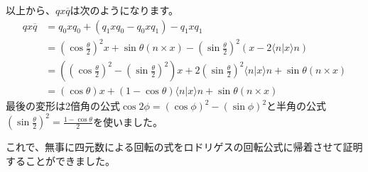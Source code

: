 \documentclass{jlreq}
\numberwithin{equation}{section}
\begin{document}
以上から、$qx\overline{q}$は次のようになります。
\begin{align}
    qx\overline{q} & =q_0xq_0+(q_1xq_0-q_0xq_1)-q_1xq_1                                                                                                                                    \\
                   & =\left(\cos\frac{\theta}{2}\right)^2x+\sin\theta(n\times x)-\left(\sin\frac{\theta}{2}\right)^2(x-2\langle n|x\rangle n)                                              \\
                   & =\left(\left(\cos\frac{\theta}{2}\right)^2-\left(\sin\frac{\theta}{2}\right)^2\right)x+2\left(\sin\frac{\theta}{2}\right)^2\langle n|x\rangle n+\sin\theta(n\times x) \\
                   & =(\cos\theta)x+(1-\cos\theta)\langle n|x\rangle n+\sin\theta(n\times x)
\end{align}
最後の変形は2倍角の公式$\cos 2\phi=(\cos\phi)^2-(\sin\phi)^2$と半角の公式$\left(\sin\frac{\theta}{2}\right)^2=\frac{1-\cos\theta}{2}$を使いました。

これで、無事に四元数による回転の式をロドリゲスの回転公式に帰着させて証明することができました。
\end{document}
